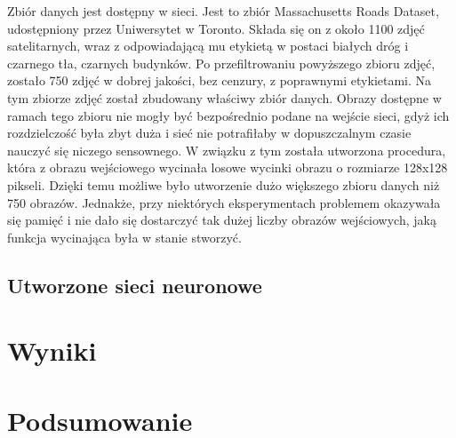 \documentclass{article}
\begin{document}
Zbiór danych jest dostępny w sieci. Jest to zbiór Massachusetts Roads Dataset, udostępniony przez Uniwersytet w Toronto. Składa się on z około 1100 zdjęć satelitarnych, wraz z odpowiadającą mu etykietą w postaci białych dróg i czarnego tła, czarnych budynków. Po przefiltrowaniu powyższego zbioru zdjęć, zostało 750 zdjęć w dobrej jakości, bez cenzury, z poprawnymi etykietami. Na tym zbiorze zdjęć został zbudowany właściwy zbiór danych. Obrazy dostępne w ramach tego zbioru nie mogły być bezpośrednio podane na wejście sieci, gdyż ich rozdzielczość była zbyt duża i sieć nie potrafiłaby w dopuszczalnym czasie nauczyć się niczego sensownego. W związku z tym została utworzona procedura, która z obrazu wejściowego wycinała losowe wycinki obrazu o rozmiarze 128x128 pikseli. Dzięki temu możliwe było utworzenie dużo większego zbioru danych niż 750 obrazów. Jednakże, przy niektórych eksperymentach problemem okazywała się pamięć i nie dało się dostarczyć tak dużej liczby obrazów wejściowych, jaką funkcja wycinająca była w stanie stworzyć.

\subsection{Utworzone sieci neuronowe}

\section{Wyniki}

\section{Podsumowanie}

\clearpage %








\end{document}
